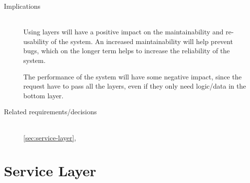 \begin{description}
\item [Implications]~\\
Using layers will have a positive impact on the maintainability and re-usability of the system. An increased maintainability will help prevent bugs, which on the longer term helps to increase the reliability of the system. 

The performance of the system will have some negative impact, since the request have to pass all the layers, even if they only need logic/data in the bottom layer.

\item [Related requirements/decisions]~\\
\ref{sec:service-layer}, 

\end{description}

\section{Service Layer}

